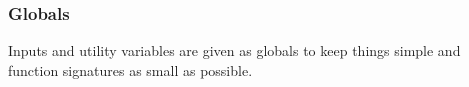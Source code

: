 \subsubsection{Globals}

\noindent
Inputs and utility variables are given as globals to keep things simple and function signatures as small as possible.





